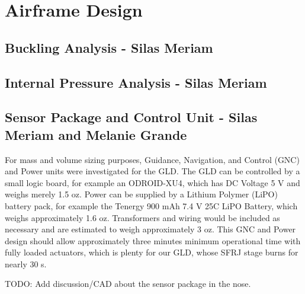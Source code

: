 \section{Airframe Design}

\subsection{Buckling Analysis - Silas Meriam}


\subsection{Internal Pressure Analysis - Silas Meriam}


\subsection{Sensor Package and Control Unit - Silas Meriam and Melanie Grande}
For mass and volume sizing purposes, Guidance, Navigation, and Control (GNC) and Power units were investigated for the GLD. The GLD can be controlled by a small logic board, for example an ODROID-XU4, which has DC Voltage 5 V and weighs merely 1.5 oz. Power can be supplied by a Lithium Polymer (LiPO) battery pack, for example the Tenergy 900 mAh 7.4 V 25C LiPO Battery, which weighs approximately 1.6 oz. Transformers and wiring would be included as necessary and are estimated to weigh approximately 3 oz. This GNC and Power design should allow approximately three minutes minimum operational time with fully loaded actuators, which is plenty for our GLD, whose SFRJ stage burns for nearly 30 s. 

\color{red}TODO: Add discussion/CAD about the sensor package in the nose.\color{black}